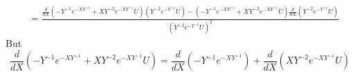 \documentclass{book}
\begin{document}
\begin{align}
&=\frac{\frac{d}{dX}\left(-Y^{-1}e^{-XY^{-1}}+XY^{-2}e^{-XY^{-1}}U\right)\left(Y^{-2}e^{-Y^{-1}}U\right)-\left(-Y^{-1}e^{-XY^{-1}}+XY^{-2}e^{-XY^{-1}}U\right)\frac{d}{dX}\left(Y^{-2}e^{-Y^{-1}}U\right)}{\left(Y^{-2}e^{-Y^{-1}}U\right)^{2}}\tag{C.8.1}
\end{align}
But
\begin{equation}
\frac{d}{dX}\left(-Y^{-1}e^{-XY^{-1}}+XY^{-2}e^{-XY^{-1}}U\right)=\frac{d}{dX}\left(-Y^{-1}e^{-XY^{-1}}\right)+\frac{d}{dX}\left(XY^{-2}e^{-XY^{-1}}U\right)\tag{C.8.2}
\end{equation}
\end{document}
